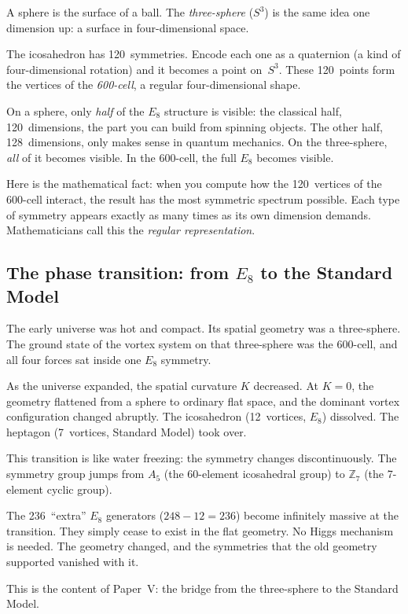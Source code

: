 A sphere is the surface of a ball. The \emph{three-sphere} ($S^3$)
is the same idea one dimension up: a surface in four-dimensional space.

The icosahedron has 120~symmetries. Encode each one as a quaternion
(a kind of four-dimensional rotation) and it becomes a point on~$S^3$.
These 120~points form the vertices of the \emph{600-cell}, a regular
four-dimensional shape.

On a sphere, only \emph{half} of the $E_8$ structure is visible: the
classical half, 120~dimensions, the part you can build from spinning
objects. The other half, 128~dimensions, only makes sense in quantum
mechanics. On the three-sphere, \emph{all} of it becomes visible.
In the 600-cell, the full $E_8$ becomes visible.

Here is the mathematical fact: when you compute how the 120~vertices
of the 600-cell interact, the result has the most symmetric spectrum
possible. Each type of symmetry appears exactly as many times as its
own dimension demands. Mathematicians call this the
\emph{regular representation}.

\subsection*{The phase transition: from $E_8$ to the Standard Model}

The early universe was hot and compact. Its spatial geometry was a
three-sphere. The ground state of the vortex system on that
three-sphere was the 600-cell, and all four forces sat inside one
$E_8$ symmetry.

As the universe expanded, the spatial curvature $K$ decreased. At
$K = 0$, the geometry flattened from a sphere to ordinary flat space,
and the dominant vortex configuration changed abruptly. The
icosahedron (12~vortices, $E_8$) dissolved. The heptagon
(7~vortices, Standard Model) took over.

This transition is like water freezing: the symmetry changes
discontinuously. The symmetry group jumps from $A_5$ (the
60-element icosahedral group) to $\mathbb{Z}_7$ (the
7-element cyclic group).

The 236~``extra'' $E_8$ generators ($248 - 12 = 236$) become
infinitely massive at the transition. They simply cease to exist in
the flat geometry. No Higgs mechanism is needed. The geometry changed,
and the symmetries that the old geometry supported vanished with it.

This is the content of Paper~V: the bridge from the three-sphere to
the Standard Model.


